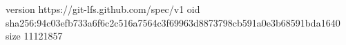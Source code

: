 version https://git-lfs.github.com/spec/v1
oid sha256:94c03efb733a6f6c2c516a7564c3f69963d8873798cb591a0e3b68591bda1640
size 11121857
